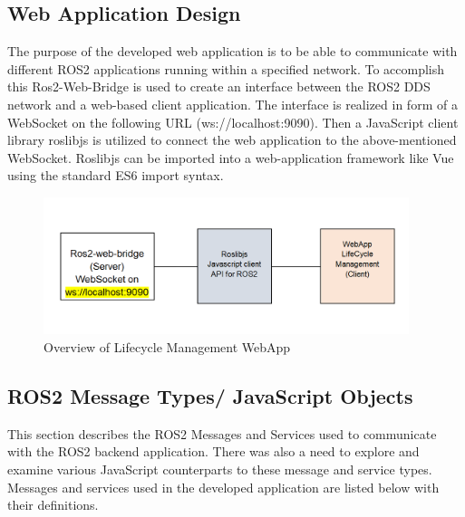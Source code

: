 \subsection{Web Application Design}
The purpose of the developed web application is to be able to communicate with different ROS2 applications running within a specified network. To accomplish this Ros2-Web-Bridge is used to create an interface between the ROS2 DDS network and a web-based client application. The interface is realized in form of a WebSocket on the following URL (ws://localhost:9090). Then a JavaScript client library roslibjs is utilized to connect the web application to the above-mentioned WebSocket. Roslibjs can be imported into a web-application framework like Vue using the standard ES6 import syntax.
	\begin{figure}[H]
		\centering
		\includegraphics[width=0.95\textwidth]{"Bilder/webapp-design.png"}
		\caption{Overview of Lifecycle Management WebApp}
		\label{fig:Background:WebappDesign}					
	\end{figure}

\subsection{ROS2 Message Types/ JavaScript Objects}
This section describes the ROS2 Messages and Services used to communicate with the ROS2 backend application. There was also a need to explore and examine various JavaScript counterparts to these message and service types. Messages and services  used in the developed application are listed below with their definitions. 

